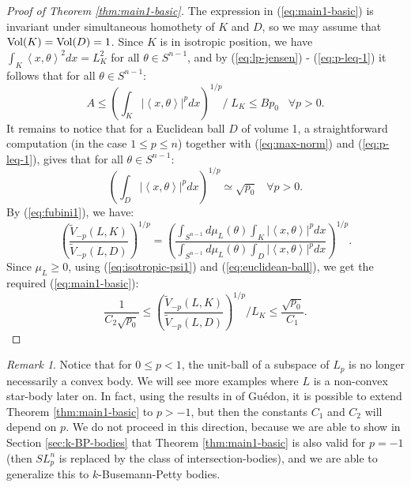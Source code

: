 \documentclass[12pt,oneside]{amsart}
\theoremstyle{definition}
\theoremstyle{remark}
\newtheorem{rem}[thm]{Remark}
\theoremstyle{proof}
\numberwithin{equation}{section}
\newcommand{\abs}[1]{\left\vert#1\right\vert}
\newcommand{\brac}[1]{\left(#1\right)}
\newcommand{\scalar}[1]{\left \langle #1 \right \rangle}
\newcommand{\abscalar}[1]{\abs{\scalar{#1}}}
\newcommand{\Vol}[1]{\textnormal{Vol} (#1)}
\begin{document}
\begin{proof}[Proof of Theorem \ref{thm:main1-basic}]
The expression in (\ref{eq:main1-basic}) is invariant under
simultaneous homothety of $K$ and $D$, so we may assume that
$\Vol{K} = \Vol{D} = 1$. Since $K$ is in isotropic position, we
have $\int_K \scalar{x,\theta}^2 dx = L_K^2$ for all $\theta \in
S^{n-1}$, and by (\ref{eq:lp-jensen}) - (\ref{eq:p-leq-1}) it
follows that for all $\theta \in S^{n-1}$:
\begin{equation} \label{eq:isotropic-psi1}
A \leq \brac{ \int_K \abscalar{x,\theta}^p dx } ^ {1/p} / \; L_K
\leq B p_0 \; \; \; \forall p > 0.
\end{equation}
It remains to notice that for a Euclidean ball $D$ of volume 1, a
straightforward computation (in the case $1\leq p \leq n$)
together with (\ref{eq:max-norm}) and (\ref{eq:p-leq-1}), gives
that for all $\theta \in S^{n-1}$:
\begin{equation} \label{eq:euclidean-ball}
\brac{ \int_D \abscalar{x,\theta}^p dx } ^ {1/p} \simeq \sqrt{p_0}
\; \; \; \forall p>0.
\end{equation}
By (\ref{eq:fubini1}), we have:
\[
\brac{ \frac{ \widetilde{V}_{-p}(L,K) }
{\widetilde{V}_{-p}(L,D)}}^{1/p} = \brac{\frac{\int_{S^{n-1}}
d\mu_L(\theta) \int_{K} \abscalar{x,\theta}^p dx}{\int_{S^{n-1}}
d\mu_L(\theta) \int_{D} \abscalar{x,\theta}^p dx}}^{1/p}.
\]
Since $\mu_L \geq 0$, using (\ref{eq:isotropic-psi1}) and
(\ref{eq:euclidean-ball}), we get the required
(\ref{eq:main1-basic}):
\[
\frac{1}{C_2 \sqrt{p_0}} \leq \brac{ \frac{
\widetilde{V}_{-p}(L,K) } {\widetilde{V}_{-p}(L,D)}}^{1/p} / L_K
\leq \frac{\sqrt{p_0}}{C_1}.
\]
\end{proof}

\begin{rem}
Notice that for $0 \leq p < 1$, the unit-ball of a subspace of
$L_p$ is no longer necessarily a convex body. We will see more
examples where $L$ is a non-convex star-body later on. In fact,
using the results in \cite{Guedon-extension-to-negative-p} of
Gu\'{e}don, it is possible to extend Theorem
\ref{thm:main1-basic} to $p>-1$, but then the constants $C_1$ and
$C_2$ will depend on $p$. We do not proceed in this direction,
because we are able to show in Section \ref{sec:k-BP-bodies} that
Theorem \ref{thm:main1-basic} is also valid for $p=-1$ (then
$SL_p^n$ is replaced by the class of intersection-bodies), and we
are able to generalize this to $k$-Busemann-Petty bodies.
\end{rem}
\end{document}
